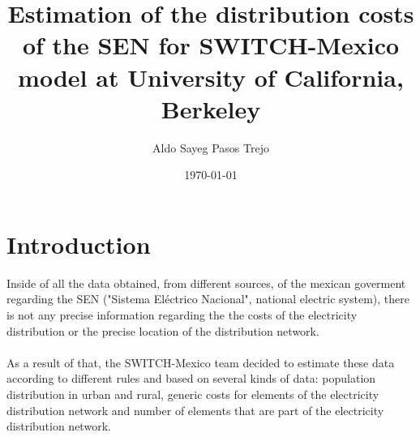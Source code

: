 \documentclass[•]{article}
\author{Aldo Sayeg Pasos Trejo}
\date{\today}
\title{Estimation of the distribution costs of the SEN for SWITCH-Mexico model at University of California, Berkeley}
\begin{document}
\maketitle
\section{Introduction}
Inside of all the data obtained, from different sources, of the mexican goverment regarding the SEN ("Sistema Eléctrico Nacional", national electric system), there is not any precise information regarding the the costs of the electricity distribution or the precise location of the distribution network.
\\
\\As a result of that, the SWITCH-Mexico team decided to estimate these data according to different rules and based on several kinds of data: population distribution in urban and rural, generic costs for elements of the electricity distribution network and number of elements that are part of the electricity distribution network.
\end{document}
